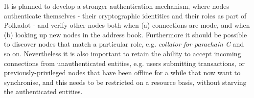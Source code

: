 It is planned to develop a stronger authentication mechanism, where nodes authenticate themselves - their cryptographic identities and their roles as part of Polkadot - and verify other nodes both when (a) connections are mode, and when (b) looking up new nodes in the address book. Furthermore it should be possible to discover nodes that match a particular role, e.g. \emph{collator for parachain C} and so on. Nevertheless it is also important to retain the ability to accept incoming connections from unauthenticated entities, e.g. users submitting transactions, or previously-privileged nodes that have been offline for a while that now want to synchronise, and this needs to be restricted on a resource basis, without starving the authenticated entities.
